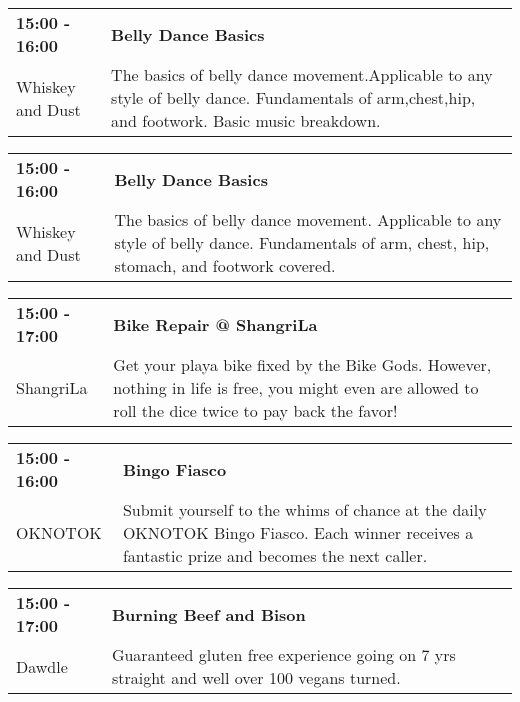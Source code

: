 \begin{tabular}{ p{1in} p{2.2in} }
    \textbf{15:00 - 16:00} & \textbf{Belly Dance Basics} \\
    Whiskey and Dust \newline  & The basics of belly dance movement.Applicable to any style of belly dance. Fundamentals of arm,chest,hip, and footwork. Basic music breakdown. \\
    \hline 
\end{tabular}
    
\begin{tabular}{ p{1in} p{2.2in} }
    \textbf{15:00 - 16:00} & \textbf{Belly Dance Basics} \\
    Whiskey and Dust \newline  & The basics of belly dance movement. Applicable to any style of belly dance. Fundamentals of arm, chest, hip, stomach, and footwork covered. \\
    \hline 
\end{tabular}
    
\begin{tabular}{ p{1in} p{2.2in} }
    \textbf{15:00 - 17:00} & \textbf{Bike Repair @ ShangriLa} \\
    ShangriLa \newline  & Get your playa bike fixed by the Bike Gods. However, nothing in life is free, you might even are allowed to roll the dice twice to pay back the favor! \\
    \hline 
\end{tabular}
    
\begin{tabular}{ p{1in} p{2.2in} }
    \textbf{15:00 - 16:00} & \textbf{Bingo Fiasco} \\
    OKNOTOK \newline  & Submit yourself to the whims of chance at the daily OKNOTOK Bingo Fiasco. Each winner receives a fantastic prize and becomes the next caller. \\
    \hline 
\end{tabular}
    
\begin{tabular}{ p{1in} p{2.2in} }
    \textbf{15:00 - 17:00} & \textbf{Burning Beef and Bison} \\
    Dawdle \newline  & Guaranteed gluten free experience going on 7 yrs straight and well over 100 vegans turned. \\
    \hline 
\end{tabular}
    
